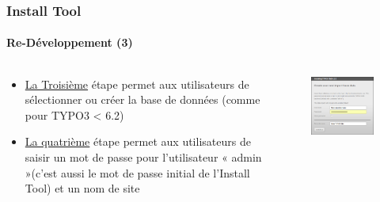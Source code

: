
\begin{frame}[fragile]
	\frametitle{Install Tool}
	\framesubtitle{Re-Développement (3)}

	\begin{columns}[T]

		\begin{column}{.5\textwidth}
			\begin{itemize}
				\item \underline{La Troisième} étape permet aux utilisateurs de sélectionner ou créer la base de données\newline
					(comme pour TYPO3 < 6.2)
				\item \underline{La quatrième} étape permet aux utilisateurs de saisir un mot de passe pour l'utilisateur « admin »\newline (c'est aussi le mot de passe initial de l'Install Tool) et un nom de site
			\end{itemize}
		\end{column}

		\begin{column}{.5\textwidth}
			\begin{figure}\vspace*{-0.4cm}
				\includegraphics[width=0.8\linewidth]{Images/InstallTool/AdminPasswordAndSiteName.png}
			\end{figure}
		\end{column}

	\end{columns}

\end{frame}

